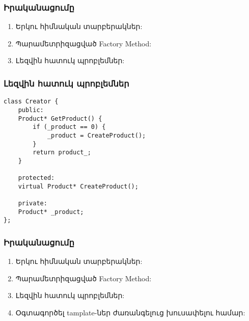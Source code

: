 \documentclass{beamer}
\begin{document}
\begin{frame}\frametitle{Իրականացումը}
\begin{enumerate}
    \item Երկու հիմնական տարբերակներ: \vspace{0.5cm}
    \item Պարամետրիզացված Factory Method: \vspace{0.5cm}
    \item Լեզվին հատուկ պրոբլեմներ: \vfill
\end{enumerate}
\end{frame}

\begin{frame}[fragile]\frametitle{Լեզվին հատուկ պրոբլեմներ}
\begin{english}
\begin{verbatim}
class Creator {
    public:
    Product* GetProduct() {
        if (_product == 0) {
            _product = CreateProduct();
        }
        return product_;
    }

    protected:
    virtual Product* CreateProduct();

    private:
    Product* _product;
};
\end{verbatim}
\end{english}
\end{frame}

\begin{frame}\frametitle{Իրականացումը}
\begin{enumerate}
    \item Երկու հիմնական տարբերակներ: \vspace{0.5cm}
    \item Պարամետրիզացված Factory Method: \vspace{0.5cm}
    \item Լեզվին հատուկ պրոբլեմներ: \vspace{0.5cm}
    \item Օգտագործել tamplate-ներ ժառանգելուց խուսափելու համար: \vfill
\end{enumerate}
\end{frame}
\end{document}
